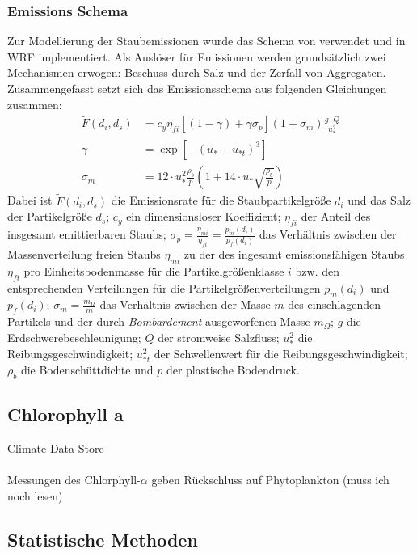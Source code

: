 \documentclass[12pt,a4paper,onecolumn,draft]{scrartcl}
\begin{document}
\subsubsection{Emissions Schema}
Zur Modellierung der Staubemissionen wurde das Schema von \citet{Shao.2004} verwendet und in WRF implementiert. Als Auslöser für Emissionen werden grundsätzlich zwei Mechanismen erwogen: Beschuss durch Salz und der Zerfall von Aggregaten. Zusammengefasst setzt sich das Emissionsschema \citep{Shao.2004} aus folgenden Gleichungen zusammen:
\begin{align}
\tilde{F} (d_i,d_s) &= c_y \eta_{fi} \left[\left(1-\gamma\right) + \gamma
\sigma_p \right] \left(1+\sigma_m \right) \frac{g \cdot Q}{u^2_*} \\
\gamma &= \exp \left[-\left(u_* - u_{*t} \right)^3\right] \\
\sigma_m &= 12 \cdot u_*^2 \frac{\rho_b}{p} \left(1 +14 \cdot u_* \sqrt{\frac{\rho_b}{p}} \right)
\end{align}
Dabei ist $\tilde{F}(d_i,d_s)$ die Emissionsrate für die Staubpartikelgröße $d_i$ und das Salz der Partikelgröße $d_s$; $c_y$ ein dimensionsloser Koeffizient; $\eta_{fi}$ der Anteil des insgesamt emittierbaren Staubs; $\sigma_p = \frac{\eta_{mi}}{\eta_{fi}} = \frac{p_{m}(d_i)}{p_{f}(d_i)}$ das Verhältnis zwischen der Massenverteilung freien Staubs $\eta_{mi}$ zu der des ingesamt emissionsfähigen Staubs $\eta_{fi}$ pro Einheitsbodenmasse für die Partikelgrößenklasse $i$ bzw. den entsprechenden Verteilungen für die Partikelgrößenverteilungen $p_{m}(d_i)$ und $p_{f}(d_i)$;  $\sigma_m= \frac{m_\Omega}{m}$ das Verhältnis zwischen der Masse  $m$ des einschlagenden Partikels und der durch \textit{Bombardement} ausgeworfenen Masse $m_\Omega$; $g$ die Erdschwerebeschleunigung; $Q$ der stromweise Salzfluss; $u_*^2$ die Reibungsgeschwindigkeit; $u_{*t}^2$ der Schwellenwert für die Reibungsgeschwindigkeit; $\rho_b$ die Bodenschüttdichte und $p$ der plastische Bodendruck.
\subsection{Chlorophyll a} \label{sec:chla}
Climate Data Store \nocite{*}
\\\\
Messungen des Chlorphyll-$\alpha$ geben Rückschluss auf Phytoplankton \citep{RYTHER.1957}(muss ich noch lesen)

\subsection{Statistische Methoden} \label{sec:stats}
\end{document}
